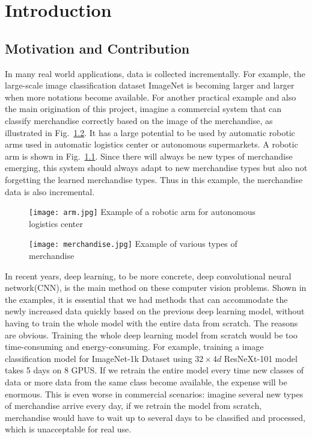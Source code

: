 
\chapter{Introduction}
\label{chap:intro}
\section{Motivation and Contribution}
In many real world applications, data is collected incrementally. For example, the large-scale image classification dataset ImageNet is becoming larger and larger when more notations become available. For another practical example and also the main origination of this project, imagine a commercial system that can classify merchandise correctly based on the image of the merchandise, as illustrated in Fig.~\ref{fig:merchandise}. It has a large potential to be used by automatic robotic arms used in automatic logistics center or autonomous supermarkets. A robotic arm is shown in Fig.~\ref{fig:arm}. Since there will always be new types of merchandise emerging, this system should always adapt to new merchandise types but also not forgetting the learned merchandise types. Thus in this example, the merchandise data is also incremental.

\begin{figure}[!htp]
	\centering
	\texttt{[image: arm.jpg]}
	{Example of a robotic arm for autonomous logistics center}
	\label{fig:arm}
\end{figure}
\begin{figure}[!htp]
	\centering
	\texttt{[image: merchandise.jpg]}
	{Example of various types of merchandise}
	\label{fig:merchandise}
\end{figure}

In recent years, deep learning, to be more concrete, deep convolutional neural network(CNN), is the main method on these computer vision problems. Shown in the examples, it is essential that we had methods that can accommodate the newly increased data quickly based on the previous deep learning model, without having to train the whole model with the entire data from scratch. The reasons are obvious. Training the whole deep learning model from scratch would be too time-consuming and energy-consuming. For example, training a image classification model for ImageNet-1k Dataset\cite{deng2009imagenet} using $32\times4d$ ResNeXt-101\cite{xie2017aggregated} model takes 5 days on 8 GPUS. If we retrain the entire model every time new classes of data or more data from the same class become available, the expense will be enormous. This is even worse in commercial scenarios: imagine several new types of merchandise arrive every day, if we retrain the model from scratch, merchandise would have to wait up to several days to be classified and processed, which is unacceptable for real use.

